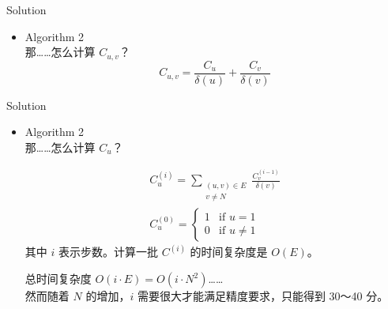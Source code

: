 \documentclass[UTF8]{beamer}
\begin{document}
\begin{frame}{Solution}
\begin{itemize}
    \item Algorithm 2 \\
        那……怎么计算 $C_{u, v}$？
        \pause
        $$
            C_{u, v} = \frac{C_u}{\delta(u)} + \frac{C_v}{\delta(v)}
        $$
\end{itemize}

\end{frame}

\begin{frame}{Solution}
\begin{itemize}
    \item Algorithm 2 \\
        那……怎么计算 $C_u$？

        \pause
        \begin{equation*}\begin{split}
            C_u^{(i)} = \sum_{\substack{(u, v) \in E \\ v \neq N}} \frac{C_v^{(i - 1)}}{\delta(v)} \\
            C_u^{(0)} = \begin{cases}
                1   &\mbox{if $u = 1$} \\
                0   &\mbox{if $u \neq 1$}
            \end{cases}
        \end{split}\end{equation*}
        \pause
        其中 $i$ 表示步数。计算一批 $C^{(i)}$ 的时间复杂度是 $O(E)$。

        总时间复杂度 $O(i \cdot E)=O(i \cdot N^2)$…… \\
        然而随着 $N$ 的增加，$i$ 需要很大才能满足精度要求，只能得到 30～40 分。
\end{itemize}

\end{frame}
\end{document}
